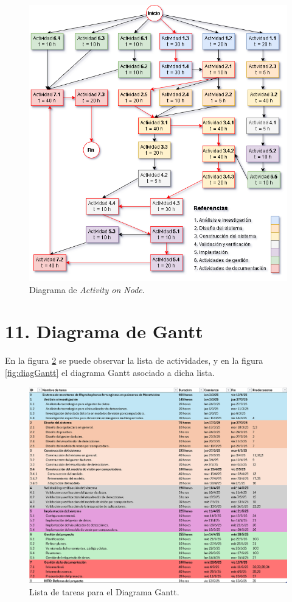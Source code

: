 \documentclass[
11pt, %
]{charter}
\begin{document}
\begin{figure}[htpb]
  \centering
  \includegraphics[width=.95\textwidth]{./Figuras/AoN.png}
  \caption{Diagrama de \textit{Activity on Node}.}
  \label{fig:AoN}
\end{figure}

\section{11. Diagrama de Gantt}
\label{sec:gantt}

En la figura \ref{fig:diagGanttAct} se puede observar la lista de actividades, y en la figura \ref{fig:diagGantt} el diagrama Gantt asociado a dicha lista.

\begin{figure}[htpb]
  \centering
  \includegraphics[height=.50\textheight]{./Figuras/lista-actividades.png}
  \caption{Lista de tareas para el Diagrama Gantt.}
  \label{fig:diagGanttAct}
\end{figure}
\end{document}
